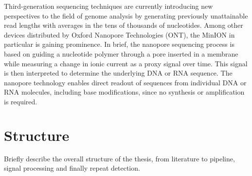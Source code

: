 Third-generation sequencing techniques are currently introducing new perspectives to the field of genome analysis by generating previously unattainable read lengths with averages in the tens of thousands of nucleotides. Among other devices distributed by Oxford Nanopore Technologies (ONT), the MinION in particular is gaining prominence. In brief, the nanopore sequencing process is based on guiding a nucleotide polymer through a pore inserted in a membrane while measuring a change in ionic current as a proxy signal over time. This signal is then interpreted to determine the underlying DNA or RNA sequence. The nanopore technology enables direct readout of sequences from individual DNA or RNA molecules, including base modifications, since no synthesis or amplification is required.

\section{Structure}
\label{sec:intro:structure}

Briefly describe the overall structure of the thesis, from literature to pipeline, signal processing and finally repeat detection.


